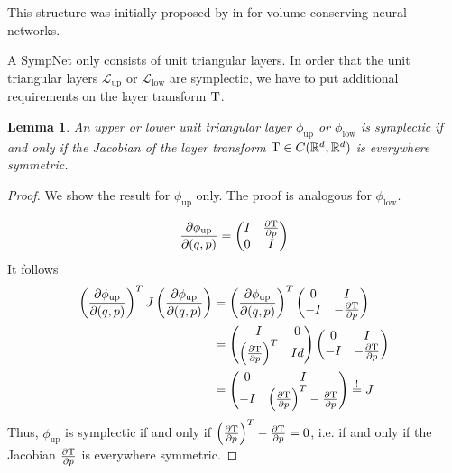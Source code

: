 \documentclass[twoside,a4paper]{article}
\newtheorem{lemma}{Lemma}
\begin{document}
This structure was initially proposed by \citeauthor{Deco1995} in \cite{Deco1995} 
 for volume-conserving neural networks.

A SympNet only consists of unit triangular layers. In order that the unit triangular layers 
$\mathcal{L}_{\text{up}}$ or $\mathcal{L}_{\text{low}}$ are symplectic,
we have to put additional requirements on the layer transform $\mathrm{T}$.

\begin{lemma}\label{jacobi_symmetric}
	An upper or lower unit triangular layer $\phi_{\text{up}}$ or $\phi_{\text{low}}$
	is symplectic if and only if the Jacobian of the layer transform
	$\mathrm{T} \in C(\mathbb{R}^d, \mathbb{R}^d)$ 
	is everywhere symmetric.
\end{lemma}
\begin{proof}
	We show the result for $\phi_{\text{up}}$ only. 
	The proof is analogous for $\phi_{\text{low}}$.

	\begin{equation*}
		\frac{\partial \phi_{\text{up}}}{\partial (q,p)} = \begin{pmatrix}
			I & \frac{\partial \mathrm{T}}{\partial p} \\
			0 & I
		\end{pmatrix}
	\end{equation*}
	It follows
	\begin{align*}
		\left( \frac{\partial \phi_{\text{up}}}{\partial (q,p)} \right)^T J \left( \frac{\partial \phi_{\text{up}}}{\partial (q,p)} \right)
		&= \left( \frac{\partial \phi_{\text{up}}}{\partial (q,p)} \right)^T \begin{pmatrix}
			0 & I \\
			-I & -\frac{\partial \mathrm{T}}{\partial p}
		\end{pmatrix} \\
		&= \begin{pmatrix}
			I & 0 \\
			\left( \frac{\partial \mathrm{T}}{\partial p} \right)^T & Id
		\end{pmatrix} \begin{pmatrix}
			0 & I \\
			-I & -\frac{\partial \mathrm{T}}{\partial p}
		\end{pmatrix} \\
		&= \begin{pmatrix}
			0 & I \\
			-I & \left( \frac{\partial \mathrm{T}}{\partial p} \right) ^T-\frac{\partial \mathrm{T}}{\partial p}
		\end{pmatrix} \overset{!}{=} J
	\end{align*}
	Thus, $\phi_{\text{up}}$ is symplectic if and only if
	$\left( \frac{\partial \mathrm{T}}{\partial p} \right) ^T-\frac{\partial \mathrm{T}}{\partial p}=0$, 
	i.e. if and only if the Jacobian $\frac{\partial \mathrm{T}}{\partial p}$ is everywhere symmetric.
\end{proof}
\end{document}

